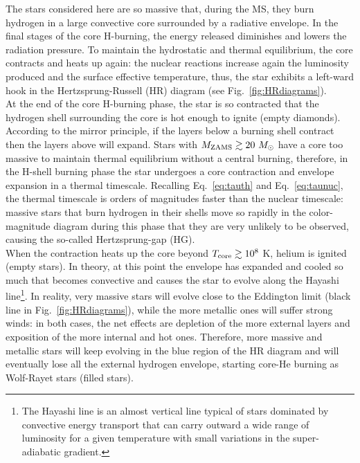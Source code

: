 \documentclass[a4paper,titlepage]{book}     	%
\newcommand{\sun}{\ensuremath{_\odot}}
\newcommand{\mzams}{M_\textup{ZAMS}}
\newcommand{\msun}{\ensuremath{M\sun}}
\begin{document}
The stars considered here are so massive that, during the MS, they burn hydrogen in a large convective core surrounded by a radiative envelope. In the final stages of the core H-burning, the energy released diminishes and lowers the radiation pressure. To maintain the hydrostatic and thermal equilibrium, the core contracts and heats up again: the nuclear reactions increase again the luminosity produced and the surface effective temperature, thus, the star exhibits a left-ward hook in the Hertzsprung-Russell (HR) diagram (see Fig.\ \ref{fig:HRdiagrams}). \\

At the end of the core H-burning phase, the star is so contracted that the hydrogen shell surrounding the core is hot enough to ignite (empty diamonds). According to the mirror principle, if the layers below a burning shell contract then the layers above will expand. Stars with $\mzams \gtrsim 20~\msun$ have a core too massive to maintain thermal equilibrium without a central burning, therefore, in the H-shell burning phase the star undergoes a core contraction and envelope expansion in a thermal timescale. Recalling Eq.\ \ref{eq:tauth} and Eq.\ \ref{eq:taunuc}, the thermal timescale is orders of magnitudes faster than the nuclear timescale: massive stars that burn hydrogen in their shells move so rapidly in the color-magnitude diagram during this phase that they are very unlikely to be observed, causing the so-called Hertzsprung-gap (HG). \\


When the contraction heats up the core beyond $T_{\rm core} \gtrsim 10^{8}$ K, helium is ignited (empty stars). In theory, at this point the envelope has expanded and cooled so much that becomes convective and causes the star to evolve along the Hayashi line\footnote{The Hayashi line is an almost vertical line typical of stars dominated by convective energy transport that can carry outward a wide range of luminosity for a given temperature with small variations in the super-adiabatic gradient.}. In reality, very massive stars will evolve close to the Eddington limit (black line in Fig.\ \ref{fig:HRdiagrams}), while the more metallic ones will suffer strong winds: in both cases, the net effects are depletion of the more external layers and exposition of the more internal and hot ones. Therefore, more massive and metallic stars will keep evolving in the blue region of the HR diagram and will eventually lose all the external hydrogen envelope, starting core-He burning as Wolf-Rayet stars (filled stars). 
\end{document}
